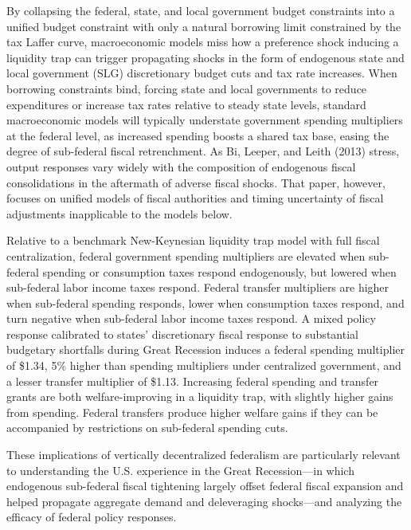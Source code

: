 \documentclass[12pt,letterpaper]{article}
\begin{document}
By collapsing the federal, state, and local government budget constraints into a unified budget constraint with only a natural borrowing limit constrained by the tax Laffer curve, macroeconomic models miss how a  preference shock inducing a liquidity trap can trigger propagating shocks in the form of endogenous state and local government (SLG) discretionary budget cuts and tax rate increases. When borrowing constraints bind, forcing state and local governments to reduce expenditures or increase tax rates relative to steady state levels, standard macroeconomic models will typically understate government spending multipliers at the federal level, as increased spending boosts a shared tax base, easing the degree of sub-federal fiscal retrenchment. As Bi, Leeper, and Leith (2013) stress, output responses vary widely with the composition of endogenous fiscal consolidations in the aftermath of adverse fiscal shocks. That paper, however, focuses on unified models of fiscal authorities and timing uncertainty of fiscal adjustments inapplicable to the models below.

Relative to a benchmark New-Keynesian liquidity trap model with full fiscal centralization, federal government spending multipliers are elevated when sub-federal spending or consumption taxes respond endogenously, but lowered when sub-federal labor income taxes respond. Federal transfer multipliers are higher when sub-federal spending responds, lower when consumption taxes respond, and turn negative when sub-federal labor income taxes respond. A mixed policy response calibrated to states' discretionary fiscal response to substantial budgetary shortfalls during Great Recession induces a federal spending multiplier of \$1.34, 5\% higher than spending multipliers under centralized government, and a lesser transfer multiplier of \$1.13. Increasing federal spending and transfer grants are both welfare-improving in a liquidity trap, with slightly higher gains from spending. Federal transfers produce higher welfare gains if they can be accompanied by restrictions on sub-federal spending cuts. 

These implications of vertically decentralized federalism are particularly relevant to understanding the U.S. experience in the Great Recession---in which endogenous sub-federal fiscal tightening largely offset federal fiscal expansion and helped propagate aggregate demand and deleveraging shocks---and analyzing the efficacy of federal policy responses.



\bigskip
\end{document}
